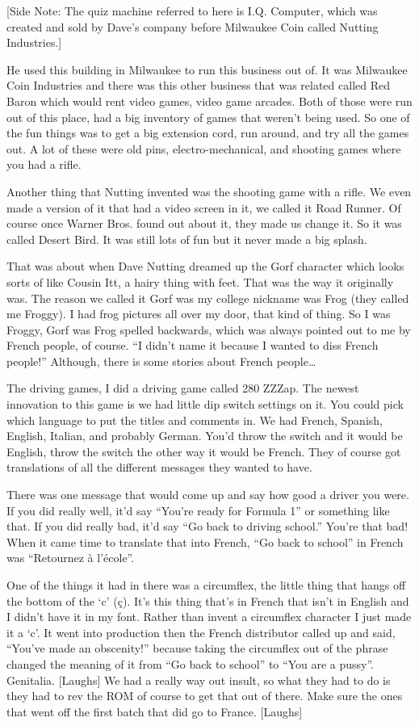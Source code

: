 [Side Note: The quiz machine referred to here is I.Q. Computer, which was created and sold by Dave’s company before Milwaukee Coin called Nutting Industries.]

He used this building in Milwaukee to run this business out of. It was Milwaukee Coin Industries and there was this other business that was related called Red Baron which would rent video games, video game arcades. Both of those were run out of this place, had a big inventory of games that weren’t being used. So one of the fun things was to get a big extension cord, run around, and try all the games out. A lot of these were old pins, electro-mechanical, and shooting games where you had a rifle.

Another thing that Nutting invented was the shooting game with a rifle. We even made a version of it that had a video screen in it, we called it Road Runner. Of course once Warner Bros. found out about it, they made us change it. So it was called Desert Bird. It was still lots of fun but it never made a big splash.

That was about when Dave Nutting dreamed up the Gorf character which looks sorts of like Cousin Itt, a hairy thing with feet. That was the way it originally was. The reason we called it Gorf was my college nickname was Frog (they called me Froggy). I had frog pictures all over my door, that kind of thing. So I was Froggy, Gorf was Frog spelled backwards, which was always pointed out to me by French people, of course. “I didn’t name it because I wanted to diss French people!” Although, there is some stories about French people…

The driving games, I did a driving game called 280 ZZZap. The newest innovation to this game is we had little dip switch settings on it. You could pick which language to put the titles and comments in. We had French, Spanish, English, Italian, and probably German. You’d throw the switch and it would be English, throw the switch the other way it would be French. They of course got translations of all the different messages they wanted to have.

There was one message that would come up and say how good a driver you were. If you did really well, it’d say “You’re ready for Formula 1” or something like that. If you did really bad, it’d say “Go back to driving school.” You’re that bad! When it came time to translate that into French, “Go back to school” in French was “Retournez à l'école”.

One of the things it had in there was a circumflex, the little thing that hangs off the bottom of the ‘c’ (ç). It’s this thing that’s in French that isn’t in English and I didn’t have it in my font. Rather than invent a circumflex character I just made it a ‘c’. It went into production then the French distributor called up and said, “You’ve made an obscenity!” because taking the circumflex out of the phrase changed the meaning of it from “Go back to school” to “You are a pussy”. Genitalia. [Laughs] We had a really way out insult, so what they had to do is they had to rev the ROM of course to get that out of there. Make sure the ones that went off the first batch that did go to France. [Laughs]


